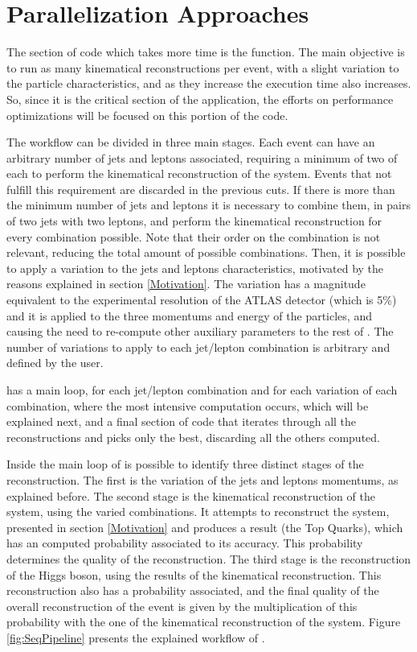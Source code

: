 \chapter{Parallelization Approaches}
\label{Parallelization:Sequential}

The section of code which takes more time is the \ttDilepKinFit function. The main objective is to run as many kinematical reconstructions per event, with a slight variation to the particle characteristics, and as they increase the \ttDilepKinFit execution time also increases. So, since it is the critical section of the application, the efforts on performance optimizations will be focused on this portion of the code.

The \ttDilepKinFit workflow can be divided in three main stages. Each event can have an arbitrary number of jets and leptons associated, requiring a minimum of two of each to perform the kinematical reconstruction of the \ttbar system. Events that not fulfill this requirement are discarded in the previous cuts. If there is more than the minimum number of jets and leptons it is necessary to combine them, in pairs of two jets with two leptons, and perform the kinematical reconstruction for every combination possible. Note that their order on the combination is not relevant, reducing the total amount of possible combinations. Then, it is possible to apply a variation to the jets and leptons characteristics, motivated by the reasons explained in section \ref{Motivation}. The variation has a magnitude equivalent to the experimental resolution of the ATLAS detector (which is 5\%) and it is applied to the three momentums and energy of the particles, and causing the need to re-compute other auxiliary parameters to the rest of \ttDilepKinFit. The number of variations to apply to each jet/lepton combination is arbitrary and defined by the user.

\ttDilepKinFit has a main loop, for each jet/lepton combination and for each variation of each combination, where the most intensive computation occurs, which will be explained next, and a final section of code that iterates through all the reconstructions and picks only the best, discarding all the others computed.

Inside the main loop of \ttDilepKinFit is possible to identify three distinct stages of the reconstruction. The first is the variation of the jets and leptons momentums, as explained before. The second stage is the kinematical reconstruction of the \ttbar system, using the varied combinations. It attempts to reconstruct the \ttbar system, presented in section \ref{Motivation} and produces a result (the Top Quarks), which has an computed probability associated to its accuracy. This probability determines the quality of the reconstruction. The third stage is the reconstruction of the Higgs boson, using the results of the kinematical reconstruction. This reconstruction also has a probability associated, and the final quality of the overall reconstruction of the event is given by the multiplication of this probability with the one of the kinematical reconstruction of the \ttbar system. Figure \ref{fig:SeqPipeline} presents the explained workflow of \ttDilepKinFit.

